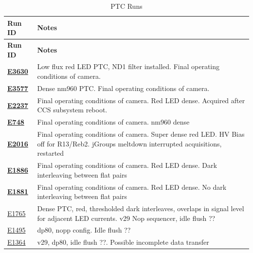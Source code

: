 \begin{longtable}{|p{5.0cm}|p{8.5cm}|}
\caption{PTC Runs}\label{table:runs_PTCs} \\
\hline
\textbf{Run ID} & \textbf{Notes} \\ \hline
\endfirsthead
\hline
\textbf{Run ID} & \textbf{Notes} \\ \hline
\endhead
\hline
\endfoot
\hline
\endlastfoot

\textbf{\href{https://s3df.slac.stanford.edu/data/rubin/lsstcam/E3630/w_2024_35/}{E3630}} & Low flux red LED PTC, ND1 filter installed. Final operating conditions of camera. \\ \hline
\textbf{\href{https://s3df.slac.stanford.edu/data/rubin/lsstcam/E3577/w_2024_35/}{E3577}} & Dense nm960 PTC. Final operating conditions of camera. \\ \hline
\textbf{\href{https://s3df.slac.stanford.edu/data/rubin/lsstcam/E2237/w_2024_35/}{E2237}} & Final operating conditions of camera. Red LED dense. Acquired after CCS subsystem reboot. \\ \hline
\textbf{\href{https://s3df.slac.stanford.edu/data/rubin/lsstcam/E748/w_2024_35/}{E748}} & Final operating conditions of camera. nm960 dense \\ \hline
\textbf{\href{https://s3df.slac.stanford.edu/data/rubin/lsstcam/E2016/w_2024_35/}{E2016}} & Final operating conditions of camera. Super dense red LED. HV Bias off for R13/Reb2. jGroups meltdown interrupted acquisitions, restarted \\ \hline
\textbf{\href{https://s3df.slac.stanford.edu/data/rubin/lsstcam/E1886/w_2024_35/}{E1886}} & Final operating conditions of camera. Red LED dense. Dark interleaving between flat pairs \\ \hline
\textbf{\href{https://s3df.slac.stanford.edu/data/rubin/lsstcam/E1881/w_2024_35/}{E1881}} & Final operating conditions of camera. Red LED dense. No dark interleaving between flat pairs \\ \hline
\href{https://s3df.slac.stanford.edu/data/rubin/lsstcam/E1765/w_2024_35/}{E1765} & Dense PTC, red, thresholded dark interleaves, overlaps in signal level for adjacent LED currents. v29 Nop sequencer, idle flush ?? \\ \hline
\href{https://s3df.slac.stanford.edu/data/rubin/lsstcam/E1495/w_2024_35/}{E1495} & dp80, nopp config. Idle flush ?? \\ \hline
\href{https://s3df.slac.stanford.edu/data/rubin/lsstcam/E1364/w_2024_35/}{E1364} & v29, dp80, idle flush ??. Possible incomplete data transfer \\ \hline

\end{longtable}
